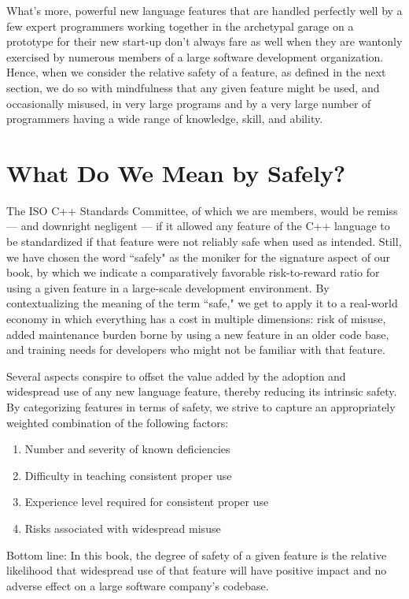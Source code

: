 What’s more, powerful new language features that are handled perfectly well by a few expert programmers working together in the archetypal garage on a prototype for their new start-up don't always fare as well when they are wantonly exercised by numerous members of a large software development organization. Hence, when we consider the relative safety of a feature, as defined in the next section, we do so with mindfulness that any given feature might be used, and occasionally misused, in very large programs and by a very large number of programmers having a wide range of knowledge, skill, and ability. %

\section[{What Do We Mean by {\sffamily\itshape Safely}?}]{What Do We Mean by {\sfbsectionitalRomeo Safely}?}

The ISO C++ Standards Committee, of which we are members, would be remiss --- and downright negligent --- if it allowed any feature of the C++ language to be standardized if that feature were not reliably safe when used as intended. Still, we have chosen the word ``safely" as the moniker for the signature aspect of our book, by which we indicate a comparatively favorable risk-to-reward ratio for using a given feature in a large-scale development environment. By contextualizing the meaning of the term ``safe," we get to apply it to a real-world economy in which everything has a cost in multiple dimensions: risk of misuse, added maintenance burden borne by using a new feature in an older code base, and training needs for developers who might not be familiar with that feature.

Several aspects conspire to offset the value added by the adoption and widespread use of any new language feature, thereby reducing its intrinsic safety. By categorizing features in terms of safety, we strive to capture an appropriately weighted combination of the following factors:
\begin{enumerate}
\item{Number and severity of known deficiencies}
\item{Difficulty in teaching consistent proper use}
\item{Experience level required for consistent proper use}
\item{Risks associated with widespread misuse}
\end{enumerate}
Bottom line: In this book, the degree of safety of a given feature is the relative likelihood that widespread use of that feature will have positive impact and no adverse effect on a large software company’s codebase.

